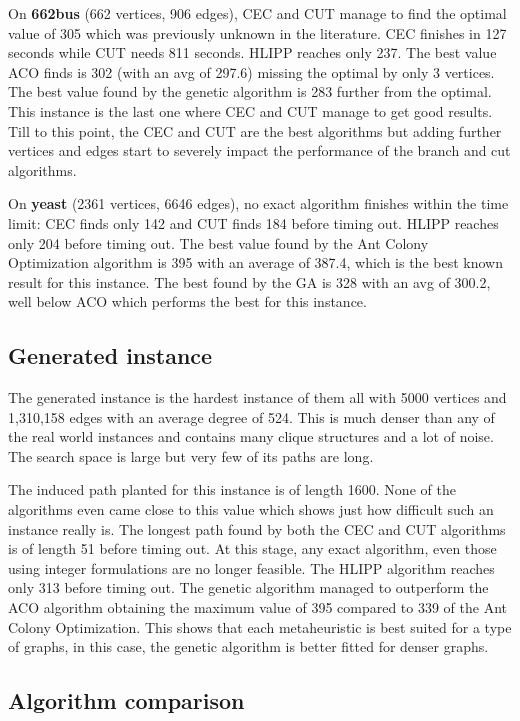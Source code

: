 On \textbf{662bus} (662 vertices, 906 edges), CEC and CUT manage to find the optimal value of 305 which was previously unknown in the literature. CEC finishes in 127 seconds while CUT needs 811 seconds. HLIPP reaches only 237. The best value ACO finds is 302 (with an avg of 297.6) missing the optimal by only 3 vertices. The best value found by the genetic algorithm is 283 further from the optimal. This instance is the last one where CEC and CUT manage to get good results. Till to this point, the CEC and CUT are the best algorithms but adding further vertices and edges start to severely impact the performance of the branch and cut algorithms.

On \textbf{yeast} (2361 vertices, 6646 edges), no exact algorithm finishes within the time limit: CEC finds only 142 and CUT finds 184 before timing out. HLIPP reaches only 204 before timing out. The best value found by the Ant Colony Optimization algorithm is 395 with an average of 387.4, which is the best known result for this instance. The best found by the GA is 328 with an avg of 300.2, well below ACO which performs the best for this instance.

\subsection{Generated instance}

The generated instance is the hardest instance of them all with 5000 vertices and 1,310,158 edges with an average degree of 524. This is much denser than any of the real world instances and contains many clique structures and a lot of noise. The search space is large but very few of its paths are long.

The induced path planted for this instance is of length 1600. None of the algorithms even came close to this value which shows just how difficult such an instance really is. The longest path found by both the CEC and CUT algorithms is of length 51 before timing out. At this stage, any exact algorithm, even those using integer formulations are no longer feasible. The HLIPP algorithm reaches only 313 before timing out. The genetic algorithm managed to outperform the ACO algorithm obtaining the maximum value of 395 compared to 339 of the Ant Colony Optimization. This shows that each metaheuristic is best suited for a type of graphs, in this case, the genetic algorithm is better fitted for denser graphs.


\subsection{Algorithm comparison}\label{sec:comparison}

